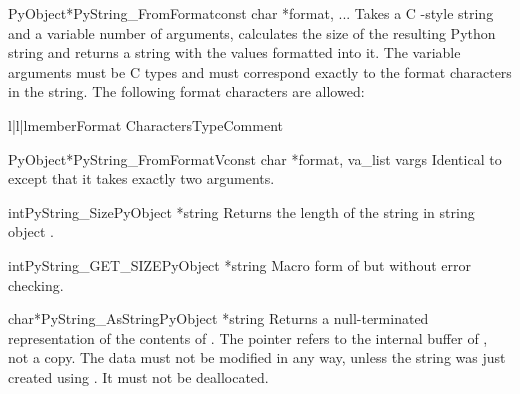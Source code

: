 \begin{cfuncdesc}{PyObject*}{PyString_FromFormat}{const char *format, ...}
  Takes a C -style  string and a
  variable number of arguments, calculates the size of the resulting
  Python string and returns a string with the values formatted into
  it.  The variable arguments must be C types and must correspond
  exactly to the format characters in the  string.  The
  following format characters are allowed:

  \begin{tableiii}{l|l|l}{member}{Format Characters}{Type}{Comment}
  \end{tableiii}
\end{cfuncdesc}

\begin{cfuncdesc}{PyObject*}{PyString_FromFormatV}{const char *format,
                                                   va_list vargs}
  Identical to  except that it takes
  exactly two arguments.
\end{cfuncdesc}

\begin{cfuncdesc}{int}{PyString_Size}{PyObject *string}
  Returns the length of the string in string object .
\end{cfuncdesc}

\begin{cfuncdesc}{int}{PyString_GET_SIZE}{PyObject *string}
  Macro form of  but without error
  checking.
\end{cfuncdesc}

\begin{cfuncdesc}{char*}{PyString_AsString}{PyObject *string}
  Returns a null-terminated representation of the contents of
  .  The pointer refers to the internal buffer of
  , not a copy.  The data must not be modified in any way,
  unless the string was just created using
  .
  It must not be deallocated.
\end{cfuncdesc}

